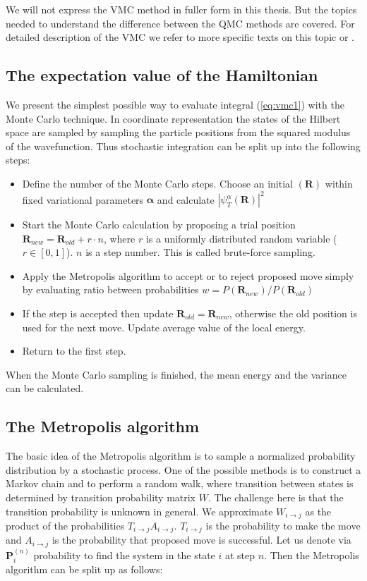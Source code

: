 \documentclass[twoside,english]{uiofysmaster}
\begin{document}
We will not express the VMC method in fuller form in this thesis. But the topics needed to understand the difference between the QMC methods are covered. For detailed description of the VMC we refer to more specific texts on this topic \cite{ToulouseIntroductionVariationalDiffusion2016} or \cite{Hjorth-Jensenadvancedcoursecomputational2017}.


\subsection{The expectation value of the Hamiltonian}

We present the simplest possible way to evaluate integral (\ref{eq:vmc1}) with the Monte Carlo technique. In coordinate representation the states of the Hilbert space are sampled by sampling the particle positions from the squared modulus of the wavefunction. Thus stochastic integration can be split up into the following steps:

\begin{itemize}
\item  Define the number of the Monte Carlo steps. Choose an initial $(\boldsymbol{R})$ within fixed variational parameters $\boldsymbol{\alpha}$ and calculate $\left|\psi_T^{\alpha}(\boldsymbol{R})\right|^2$
\item Start the Monte Carlo calculation by proposing a trial position $\boldsymbol{R}_{new}=\boldsymbol{R}_{old}+r\cdot n$, where $r$ is a uniformly distributed random variable ($r \in [0,1]$). $n$ is a step number. This is called brute-force sampling.
\item Apply the Metropolis algorithm to accept or to reject proposed move simply by evaluating ratio between probabilities $w = P(\boldsymbol{R}_{new})/P(\boldsymbol{R}_{old})$
\item If the step is accepted then update $\boldsymbol{R}_{old}=\boldsymbol{R}_{new}$, otherwise the old position is used for the next move. Update average value of the local energy. 
\item Return to the first step.
\end{itemize} 
When the Monte Carlo sampling is finished, the mean energy and the
variance can be calculated.

\subsection{The Metropolis algorithm}
The basic idea of the Metropolis algorithm is to sample a normalized probability distribution by a stochastic process. One of the possible methods is to construct a Markov chain and to perform a random walk, where transition between states is determined by transition probability matrix $W$. The challenge here is that the transition probability is unknown in general. We approximate $W_{i\rightarrow j}$ as the product of the probabilities $T_{i\rightarrow j} A_{i\rightarrow j}$. $T_{i\rightarrow j}$ is the probability to make the move and $A_{i\rightarrow j}$ is the probability that proposed move is successful. 
 Let us denote via $\mathbf{P}_i^{(n)}$ probability to find the system in the state $i$ at step $n$. Then the Metropolis algorithm can be split up as follows:
\end{document}
